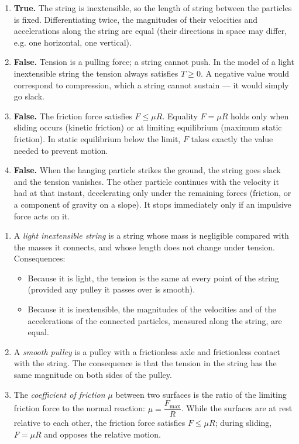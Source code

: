 \documentclass[11pt]{article}
\begin{document}
\begin{corrige}
\begin{enumerate}
\item \textbf{True.} The string is inextensible, so the length of string between the particles is fixed. Differentiating twice, the magnitudes of their velocities and accelerations along the string are equal (their directions in space may differ, e.g. one horizontal, one vertical).
\item \textbf{False.} Tension is a pulling force; a string cannot push. In the model of a light inextensible string the tension always satisfies $T \ge 0$. A negative value would correspond to compression, which a string cannot sustain — it would simply go slack.
\item \textbf{False.} The friction force satisfies $F \le \mu R$. Equality $F = \mu R$ holds only when sliding occurs (kinetic friction) or at limiting equilibrium (maximum static friction). In static equilibrium below the limit, $F$ takes exactly the value needed to prevent motion.
\item \textbf{False.} When the hanging particle strikes the ground, the string goes slack and the tension vanishes. The other particle continues with the velocity it had at that instant, decelerating only under the remaining forces (friction, or a component of gravity on a slope). It stops immediately only if an impulsive force acts on it.
\end{enumerate}
\end{corrige}

\begin{corrige}
\begin{enumerate}
\item A \emph{light inextensible string} is a string whose mass is negligible compared with the masses it connects, and whose length does not change under tension.
Consequences:
\begin{itemize}
\item Because it is light, the tension is the same at every point of the string (provided any pulley it passes over is smooth).
\item Because it is inextensible, the magnitudes of the velocities and of the accelerations of the connected particles, measured along the string, are equal.
\end{itemize}
\item A \emph{smooth pulley} is a pulley with a frictionless axle and frictionless contact with the string. The consequence is that the tension in the string has the same magnitude on both sides of the pulley.
\item The \emph{coefficient of friction} $\mu$ between two surfaces is the ratio of the limiting friction force to the normal reaction: $\mu = \dfrac{F_{\max}}{R}$. While the surfaces are at rest relative to each other, the friction force satisfies $F \le \mu R$; during sliding, $F = \mu R$ and opposes the relative motion.
\end{enumerate}
\end{corrige}
\end{document}
